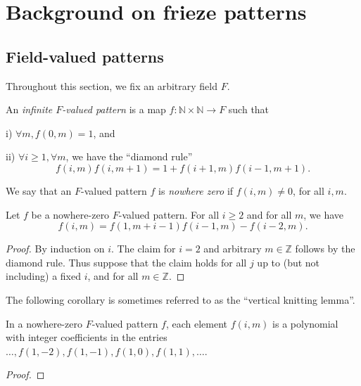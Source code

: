 \chapter{Background on frieze patterns}\label{s:fp}
\section{Field-valued patterns}
Throughout this section, we fix an arbitrary field $F$. 
\begin{definition}\label{def:pattern}
    \leanok
    An {\it infinite $F$-valued pattern} is a map $f : \mathbb{N}\times\mathbb{N} \to F$ such that 
    
    i) $\forall m, f(0,m) = 1$, and 

    ii) $\forall i \geq 1, \forall m$, we have the ``diamond rule'' 
    \[
        f (i,m) f(i,m+1) = 1 + f(i+1,m) f(i-1,m+1).
    \]
\end{definition}
We say that an $F$-valued pattern $f$ is {\it nowhere zero} if $f(i,m) \neq 0$, for all $i,m$.  
\begin{lemma}
    \label{l:inftyContinuant}
    \leanok
    Let $f$ be a nowhere-zero $F$-valued pattern. For all $i \geq 2$ and for all $m$, we have 
    \[
        f(i,m) = f(1,m+i-1) f(i-1,m) - f(i-2,m).
    \]
\end{lemma}
\begin{proof}
    \leanok
    By induction on $i$. The claim for $i =2$ and arbitrary $m \in \mathbb{Z}$ follows by the diamond rule. Thus suppose that the 
    claim holds for all $j$ up
    to (but not including) a fixed $i$, and for all $m \in \mathbb{Z}$.   
\end{proof}

The following corollary is sometimes referred to as the ``vertical knitting lemma''.  
\begin{corollary}
    \label{l:horiztonal-knit}
    In a nowhere-zero $F$-valued pattern $f$, each element $f(i,m)$ is a polynomial with integer coefficients in the 
    entries $\ldots, f(1,-2), f(1,-1), f(1,0), f(1,1), \ldots$. 
\end{corollary}
\begin{proof}

\end{proof}

